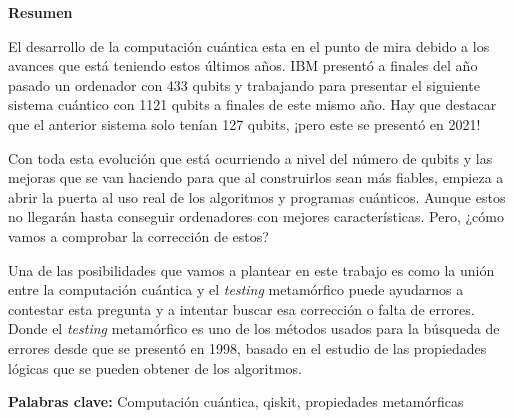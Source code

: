 \newpage

\thispagestyle{empty}

\begin{center}

{\bf \Huge Resumen}

  \end{center}
\vspace{1cm}

 El desarrollo de la computación cuántica esta en el punto de mira debido a los avances que está teniendo estos últimos años. IBM presentó a finales del año pasado un ordenador con 433 qubits y trabajando para presentar el siguiente sistema cuántico con 1121 qubits a finales de este mismo año. Hay que destacar que el anterior sistema solo tenían 127 qubits, ¡pero este se presentó en 2021! \newline

Con toda esta evolución que está ocurriendo a nivel del número de qubits y las mejoras que se van haciendo para que al construirlos sean  más fiables, empieza a abrir la puerta al uso real de los algoritmos y programas cuánticos. Aunque estos no llegarán hasta conseguir ordenadores con mejores características. Pero, ¿cómo vamos a comprobar la corrección de estos? \newline 

Una de las posibilidades que vamos a plantear en este trabajo es como la unión entre la computación cuántica y el \textit{testing} metamórfico puede ayudarnos a contestar esta pregunta y a intentar buscar esa corrección o falta de errores. Donde el \textit{testing} metamórfico es uno de los métodos usados para la búsqueda de errores desde que se presentó en 1998, basado en el estudio de las propiedades lógicas que se pueden obtener de los algoritmos.

\vspace{1cm}



\textbf{Palabras clave:} Computación cuántica, qiskit, propiedades metamórficas
   
   
   